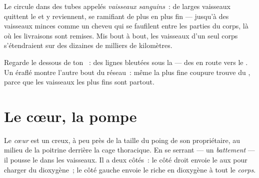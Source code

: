 \begin{definition}\label{def:g4:heart-and-blood:vessels}
Le  circule dans des tubes appelés \emph{vaisseaux
sanguins}~: de larges vaisseaux quittent le
 et y reviennent, se ramifiant de plus en plus fin --- jusqu'à
des vaisseaux minces comme un cheveu qui se faufilent entre les
parties du corps, là où les livraisons sont remises. Mis bout à
bout, les vaisseaux d'un seul corps s'étendraient sur des dizaines
de milliers de kilomètres.
\end{definition}

\begin{remark}\label{rem:g4:heart-and-blood:see}
Regarde le dessous de ton ~: des lignes bleutées sous la 
--- des  en route vers le . Un  éraflé
montre l'autre bout du réseau~: même la plus fine coupure trouve du
, parce que les vaisseaux les plus fins sont partout.
\end{remark}

\section{Le cœur, la pompe}

\begin{definition}[Le cœur]\label{def:g4:heart-and-blood:heart}
Le \emph{cœur} est un  creux, à peu près de la
taille du poing de son propriétaire, au milieu de la poitrine
derrière la cage thoracique. En se serrant --- un
\emph{battement} --- il pousse le  dans
les vaisseaux. Il a deux côtés~: le côté droit envoie le  aux
\emph{} pour charger du dioxygène~; le côté gauche envoie le
 riche en dioxygène à tout le \emph{corps}.
\end{definition}

